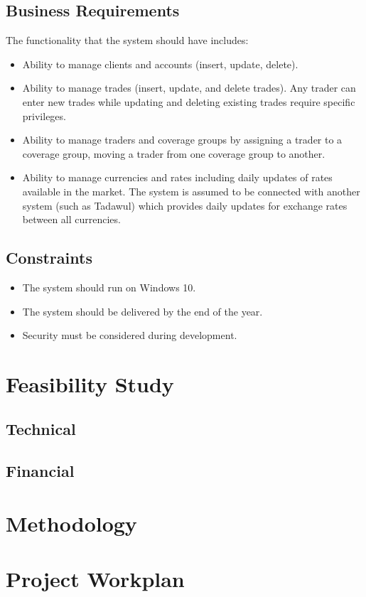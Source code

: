 \documentclass[a4paper]{report}
\begin{document}
\section{Business Requirements}
The functionality that the system should have includes:
\begin{itemize}
    \item Ability to manage clients and accounts (insert, update, delete).
    \item Ability to manage trades (insert, update, and delete trades). Any trader can enter new trades while updating and deleting existing trades require specific privileges.
    \item Ability to manage traders and coverage groups by assigning a trader to a coverage group, moving a trader from one coverage group to another.
    \item Ability to manage currencies and rates including daily updates of rates available in the market. The system is assumed to be connected with another system (such as Tadawul) which provides daily updates for exchange rates between all currencies.
\end{itemize}

\section{Constraints}
\begin{itemize}
    \item The system should run on Windows 10.
    \item The system should be delivered by the end of the year.
    \item Security must be considered during development.
\end{itemize}

\chapter{Feasibility Study}

\section{Technical}

\section{Financial}

\chapter{Methodology}

\chapter{Project Workplan}
\end{document}
